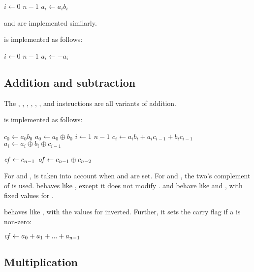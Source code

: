 \documentclass[a4paper,11pt]{kth-mag}
\renewcommand{\gets}{\leftarrow}
\newcommand{\AND}{}
\newcommand{\IOR}{+}
\newcommand{\XOR}{\oplus}
\newcommand{\NOT}{-}
\begin{document}
\begin{codebox}
\zi \For $i \gets 0$ \To $n-1$
\zi \Do
      $a_i \gets a_i \AND b_i$
    \End
\end{codebox}

 and  are implemented similarly.

 is implemented as follows:

\begin{codebox}
\zi \For $i \gets 0$ \To $n-1$
\zi \Do
      $a_i \gets \NOT a_i$
    \End
\end{codebox}

\subsection{Addition and subtraction}

The , , , , , ,  and  instructions are all variants of addition.

 is implemented as follows:

\begin{codebox}
\zi $c_0 \gets a_0 \AND b_0$
\zi $a_0 \gets a_0 \XOR b_0$
\zi \For $i \gets 1$ \To $n-1$
\zi \Do
      $c_i \gets a_i \AND b_i \IOR a_i \AND c_{i-1} \IOR b_i \AND c_{i-1}$
\zi   $a_i \gets a_i \XOR b_i \XOR c_{i-1}$
    \End
\end{codebox}

\begin{codebox}
\zi $\id{cf} \gets c_{n-1}$
\zi $\id{of} \gets c_{n-1} \XOR c_{n-2}$
\end{codebox}

For  and ,  is taken into account when  and  are set.
For  and , the two's complement of  is used.
 behaves like , except it does not modify .
 and  behave like  and , with fixed values for .

 behaves like , with the values for  inverted.
Further, it sets the carry flag if a is non-zero:

\begin{codebox}
\zi $\id{cf} \gets a_0 + a_1 + ... + a_{n-1}$
\end{codebox}

\subsection{Multiplication}
\end{document}
